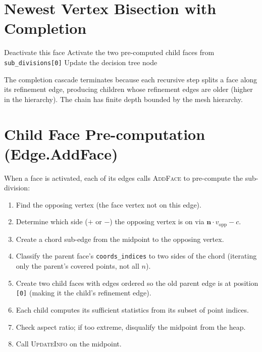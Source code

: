 \documentclass{article}
\begin{document}
\section{Newest Vertex Bisection with Completion}

\begin{algorithm}[H]
\caption{Face.Split(edge)}
\begin{algorithmic}[1]
     
        \State {} 
        \State \Return {}
    \EndIf
    \State Deactivate this face
    \State Activate the two pre-computed child faces from \texttt{sub\_divisions[0]}
    \State Update the decision tree node
\end{algorithmic}
\end{algorithm}

The completion cascade terminates because each recursive step splits a face along its refinement edge, producing children whose refinement edges are older (higher in the hierarchy). The chain has finite depth bounded by the mesh hierarchy.

\section{Child Face Pre-computation (Edge.AddFace)}

When a face is activated, each of its edges calls \textsc{AddFace} to pre-compute the sub-division:

\begin{enumerate}
    \item Find the opposing vertex (the face vertex not on this edge).
    \item Determine which side ($+$ or $-$) the opposing vertex is on via $\mathbf{n} \cdot v_{\text{opp}} - c$.
    \item Create a chord sub-edge from the midpoint to the opposing vertex.
    \item Classify the parent face's \texttt{coords\_indices} to two sides of the chord (iterating only the parent's covered points, not all $n$).
    \item Create two child faces with edges ordered so the old parent edge is at position \texttt{[0]} (making it the child's refinement edge).
    \item Each child computes its sufficient statistics from its subset of point indices.
    \item Check aspect ratio; if too extreme, disqualify the midpoint from the heap.
    \item Call \textsc{UpdateInfo} on the midpoint.
\end{enumerate}
\end{document}
